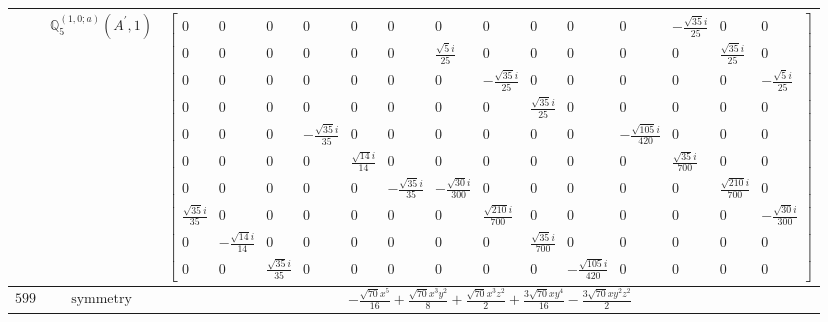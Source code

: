 \documentclass[fleqn,8pt,landscape]{jsarticle}
\begin{document}
\begin{longtable}{ccc}
$  $ & $ \mathbb{Q}_{5}^{(1,0;a)}(A^{\prime},1) $ & $ \begin{bmatrix} 0 & 0 & 0 & 0 & 0 & 0 & 0 & 0 & 0 & 0 & 0 & - \frac{\sqrt{35} i}{25} & 0 & 0 \\ 0 & 0 & 0 & 0 & 0 & 0 & \frac{\sqrt{5} i}{25} & 0 & 0 & 0 & 0 & 0 & \frac{\sqrt{35} i}{25} & 0 \\ 0 & 0 & 0 & 0 & 0 & 0 & 0 & - \frac{\sqrt{35} i}{25} & 0 & 0 & 0 & 0 & 0 & - \frac{\sqrt{5} i}{25} \\ 0 & 0 & 0 & 0 & 0 & 0 & 0 & 0 & \frac{\sqrt{35} i}{25} & 0 & 0 & 0 & 0 & 0 \\ 0 & 0 & 0 & - \frac{\sqrt{35} i}{35} & 0 & 0 & 0 & 0 & 0 & 0 & - \frac{\sqrt{105} i}{420} & 0 & 0 & 0 \\ 0 & 0 & 0 & 0 & \frac{\sqrt{14} i}{14} & 0 & 0 & 0 & 0 & 0 & 0 & \frac{\sqrt{35} i}{700} & 0 & 0 \\ 0 & 0 & 0 & 0 & 0 & - \frac{\sqrt{35} i}{35} & - \frac{\sqrt{30} i}{300} & 0 & 0 & 0 & 0 & 0 & \frac{\sqrt{210} i}{700} & 0 \\ \frac{\sqrt{35} i}{35} & 0 & 0 & 0 & 0 & 0 & 0 & \frac{\sqrt{210} i}{700} & 0 & 0 & 0 & 0 & 0 & - \frac{\sqrt{30} i}{300} \\ 0 & - \frac{\sqrt{14} i}{14} & 0 & 0 & 0 & 0 & 0 & 0 & \frac{\sqrt{35} i}{700} & 0 & 0 & 0 & 0 & 0 \\ 0 & 0 & \frac{\sqrt{35} i}{35} & 0 & 0 & 0 & 0 & 0 & 0 & - \frac{\sqrt{105} i}{420} & 0 & 0 & 0 & 0 \end{bmatrix} $ \\ \hline
$ 599 $ & $ \text{symmetry} $ & $ - \frac{\sqrt{70} x^{5}}{16} + \frac{\sqrt{70} x^{3} y^{2}}{8} + \frac{\sqrt{70} x^{3} z^{2}}{2} + \frac{3 \sqrt{70} x y^{4}}{16} - \frac{3 \sqrt{70} x y^{2} z^{2}}{2} $ \\

\end{longtable}
\end{document}
